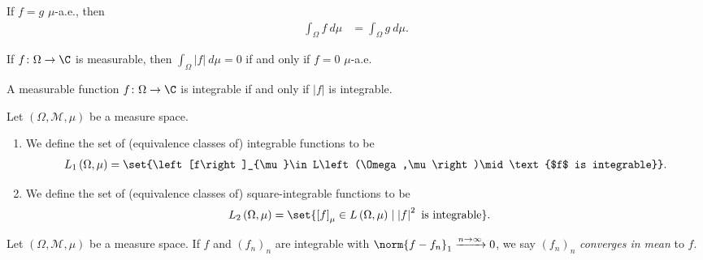 \begin{fact}
  If $f = g$ $\mu$-a.e., then
  \begin{align*}
    \int_{\Omega}^{} f\:d\mu &= \int_{\Omega}^{} g\:d\mu.
  \end{align*}
\end{fact}
\begin{fact}
  If $f\colon \Omega\rightarrow \C$ is measurable, then $\int_{\Omega}^{} \left\vert f \right\vert\:d\mu = 0$ if and only if $f = 0$ $\mu$-a.e.
\end{fact}
\begin{fact}
  A measurable function $f\colon \Omega\rightarrow \C$ is integrable if and only if $\left\vert f \right\vert$ is integrable.
\end{fact}
\begin{definition}
  Let $\left(\Omega,\mathcal{M},\mu\right)$ be a measure space.
  \begin{enumerate}[(1)]
    \item We define the set of (equivalence classes of) integrable functions to be
      \begin{align*}
        L_{1}\left(\Omega,\mu\right) = \set{\left[f\right]_{\mu}\in L\left(\Omega,\mu\right)\mid \text{$f$ is integrable}}.
      \end{align*}
    \item We define the set of (equivalence classes of) square-integrable functions to be
      \begin{align*}
        L_{2}\left(\Omega,\mu\right) &= \set{\left[f\right]_{\mu}\in L\left(\Omega,\mu\right)\mid \left\vert f \right\vert^2\text{ is integrable}}.
      \end{align*}
  \end{enumerate}
\end{definition}
\begin{definition}
  Let $\left(\Omega,\mathcal{M},\mu\right)$ be a measure space. If $f$ and $\left(f_n\right)_n$ are integrable with $\norm{f-f_n}_{1}\xrightarrow{n\rightarrow\infty}0$, we say $\left(f_n\right)_n$ \textit{converges in mean} to $f$.
\end{definition}

